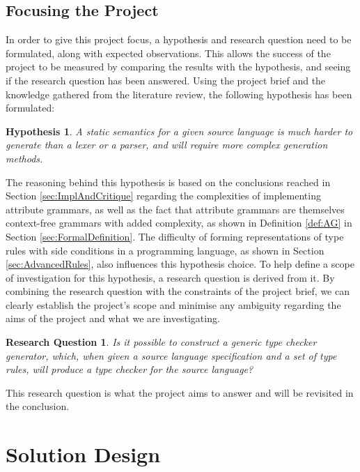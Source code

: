 \documentclass{UoYCSproject}
\newtheorem*{hypothesis}{Hypothesis}
\newtheorem*{researchquestion}{Research Question}
\begin{document}
\section{Focusing the Project}
In order to give this project focus, a hypothesis and research question need to
be formulated, along with expected observations. This allows the 
success of the project to be measured by comparing the results with
the hypothesis, and seeing if the research question has been answered. 
Using the project brief and the
knowledge gathered from the literature review, the following hypothesis has been
formulated:
\begin{hypothesis}
    A static semantics for a given source language is much harder to generate
    than a lexer or a parser, and will require more complex generation methods.
\end{hypothesis}
The reasoning behind this hypothesis is based on the conclusions reached in
Section \ref{sec:ImplAndCritique} regarding the complexities of implementing 
attribute grammars, as well as the fact that attribute grammars are 
themselves context-free grammars with added complexity, as shown in Definition 
\ref{def:AG} in Section \ref{sec:FormalDefinition}. The difficulty of forming
representations of type rules with side conditions in a programming language,
as shown in Section \ref{sec:AdvancedRules}, also influences this hypothesis 
choice.
To help define a scope of investigation for this hypothesis, a research question 
is derived from it. By combining the research question with the constraints of the
project brief, we can clearly establish the project's scope and minimise any 
ambiguity regarding the aims of the project and what we are investigating.
\begin{researchquestion}
    Is it possible to construct a generic type checker generator, which, when 
    given a source language specification and a set of type rules, will produce 
    a type checker for the source language?
\end{researchquestion}
This research question is what the project aims to answer and will be revisited
in the conclusion.


\chapter{Solution Design}
\end{document}
